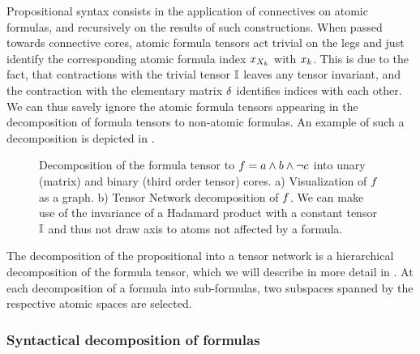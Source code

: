 Propositional syntax consists in the application of connectives on atomic formulas, and recursively on the results of such constructions.
When passed towards connective cores, atomic formula tensors act trivial on the legs and just identify the corresponding atomic formula index $x_{X_{k}}$ with $x_{k}$.
This is due to the fact, that contractions with the trivial tensor $\mathbb{I}$ leaves any tensor invariant, and the contraction with the elementary matrix $\delta$ identifies indices with each other.
We can thus savely ignore the atomic formula tensors appearing in the decomposition of formula tensors to non-atomic formulas.
An example of such a decomposition is depicted in .

\begin{figure}[h]
\begin{center}
	
\end{center}
\caption{Decomposition of the formula tensor to $f = a \land b \land \lnot c$ into unary (matrix) and binary (third order tensor) cores.
	a) Visualization of $f$ as a graph. %
	b) Tensor Network decomposition of $f$.
	We can make use of the invariance of a Hadamard product with a constant tensor $\mathbb{I}$ and thus not draw axis to atoms not affected by a formula.}
\label{fig:decompositionExample}
\end{figure}

\begin{remark}
	The decomposition of the propositional into a tensor network is a hierarchical decomposition of the formula tensor, which we will describe in more detail in .
	At each decomposition of a formula into sub-formulas, two subspaces spanned by the respective atomic spaces are selected. 
\end{remark}


\subsubsection{Syntactical decomposition of formulas}\label{sec:termClauseDecomposition}


